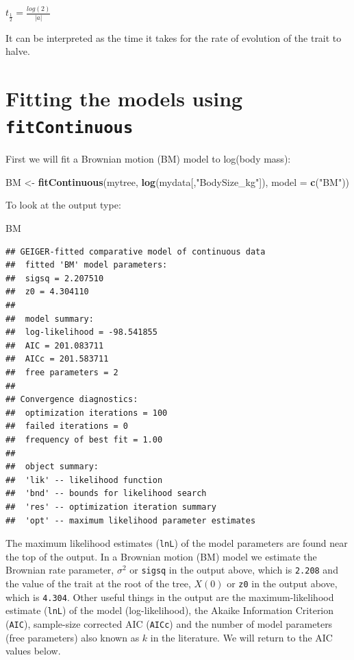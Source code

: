 \documentclass[]{book}
\newenvironment{Shaded}{\begin{snugshade}}{\end{snugshade}}
\newcommand{\KeywordTok}[1]{\textcolor[rgb]{0.13,0.29,0.53}{\textbf{{#1}}}}
\newcommand{\DataTypeTok}[1]{\textcolor[rgb]{0.13,0.29,0.53}{{#1}}}
\newcommand{\StringTok}[1]{\textcolor[rgb]{0.31,0.60,0.02}{{#1}}}
\newcommand{\NormalTok}[1]{{#1}}
\begin{document}
\(t_{\frac{1}{2}} = \frac{log(2)}{|a|}\)

It can be interpreted as the time it takes for the rate of evolution of
the trait to halve.

\section{\texorpdfstring{Fitting the models using
\texttt{fitContinuous}}{Fitting the models using fitContinuous}}\label{fitting-the-models-using-fitcontinuous}

First we will fit a Brownian motion (BM) model to log(body mass):

\begin{Shaded}
\begin{Highlighting}[]
\NormalTok{BM <-}\StringTok{ }\KeywordTok{fitContinuous}\NormalTok{(mytree, }\KeywordTok{log}\NormalTok{(mydata[,}\StringTok{"BodySize_kg"}\NormalTok{]), }\DataTypeTok{model =} \KeywordTok{c}\NormalTok{(}\StringTok{"BM"}\NormalTok{))}
\end{Highlighting}
\end{Shaded}

To look at the output type:

\begin{Shaded}
\begin{Highlighting}[]
\NormalTok{BM}
\end{Highlighting}
\end{Shaded}

\begin{verbatim}
## GEIGER-fitted comparative model of continuous data
##  fitted 'BM' model parameters:
##  sigsq = 2.207510
##  z0 = 4.304110
## 
##  model summary:
##  log-likelihood = -98.541855
##  AIC = 201.083711
##  AICc = 201.583711
##  free parameters = 2
## 
## Convergence diagnostics:
##  optimization iterations = 100
##  failed iterations = 0
##  frequency of best fit = 1.00
## 
##  object summary:
##  'lik' -- likelihood function
##  'bnd' -- bounds for likelihood search
##  'res' -- optimization iteration summary
##  'opt' -- maximum likelihood parameter estimates
\end{verbatim}

The maximum likelihood estimates (\texttt{lnL}) of the model parameters
are found near the top of the output. In a Brownian motion (BM) model we
estimate the Brownian rate parameter, \(\sigma^2\) or \texttt{sigsq} in
the output above, which is \texttt{2.208} and the value of the trait at
the root of the tree, \(X(0)\) or \texttt{z0} in the output above, which
is \texttt{4.304}. Other useful things in the output are the
maximum-likelihood estimate (\texttt{lnL}) of the model
(log-likelihood), the Akaike Information Criterion (\texttt{AIC}),
sample-size corrected AIC (\texttt{AICc}) and the number of model
parameters (free parameters) also known as \(k\) in the literature. We
will return to the AIC values below.
\end{document}
